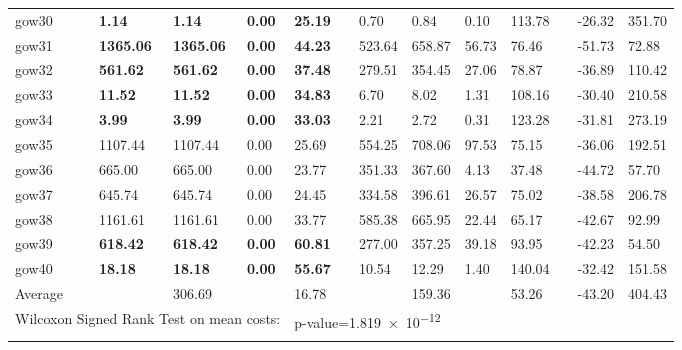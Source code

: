 \begin{table}[H]
\begin{tabularx}{\textwidth}{llXXXXlXXXXlXX}
    gow30 && \textbf{1.14} & \textbf{1.14} & \textbf{0.00} & \textbf{25.19} && 0.70 & 0.84 & 0.10 & 113.78 && -26.32 & 351.70\\
    gow31 && \textbf{1365.06} & \textbf{1365.06} & \textbf{0.00} & \textbf{44.23} && 523.64 & 658.87 & 56.73 & 76.46 && -51.73 & 72.88\\
    gow32 && \textbf{561.62} & \textbf{561.62} & \textbf{0.00} & \textbf{37.48} && 279.51 & 354.45 & 27.06 & 78.87 && -36.89 & 110.42\\
    gow33 && \textbf{11.52} & \textbf{11.52} & \textbf{0.00} & \textbf{34.83} && 6.70 & 8.02 & 1.31 & 108.16 && -30.40 & 210.58\\
    gow34 && \textbf{3.99} & \textbf{3.99} & \textbf{0.00} & \textbf{33.03} && 2.21 & 2.72 & 0.31 & 123.28 && -31.81 & 273.19\\
    gow35 && 1107.44 & 1107.44 & 0.00 & 25.69 && 554.25 & 708.06 & 97.53 & 75.15 && -36.06 & 192.51\\
    gow36 && 665.00 & 665.00 & 0.00 & 23.77 && 351.33 & 367.60 & 4.13 & 37.48 && -44.72 & 57.70\\
    gow37 && 645.74 & 645.74 & 0.00 & 24.45 && 334.58 & 396.61 & 26.57 & 75.02 && -38.58 & 206.78\\
    gow38 && 1161.61 & 1161.61 & 0.00 & 33.77 && 585.38 & 665.95 & 22.44 & 65.17 && -42.67 & 92.99\\
    gow39 && \textbf{618.42} & \textbf{618.42} & \textbf{0.00} & \textbf{60.81} && 277.00 & 357.25 & 39.18 & 93.95 && -42.23 & 54.50\\
    gow40 && \textbf{18.18} & \textbf{18.18} & \textbf{0.00} & \textbf{55.67} && 10.54 & 12.29 & 1.40 & 140.04 && -32.42 & 151.58\\
    \hline
    \multicolumn{1}{l}{Average} &&& 306.69 && 16.78 &&& 159.36 && 53.26 && -43.20 & 404.43\\
    \hline
    \multicolumn{5}{l}{Wilcoxon Signed Rank Test on mean costs:} & \multicolumn{9}{l}{p-value=\num{1.819e-12}}\\
        \lasthline
    \end{tabularx}
    \normalsize
\end{table}
